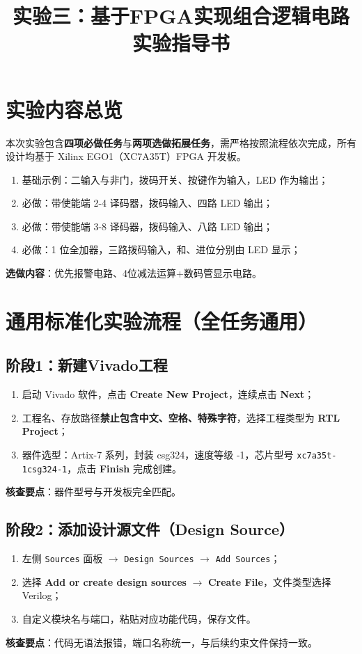 \documentclass[11pt,a4paper]{article}
\begin{document}
\title{实验三：基于FPGA实现组合逻辑电路实验指导书}
\author{}
\date{}
\maketitle

\section{实验内容总览}
本次实验包含\textbf{四项必做任务}与\textbf{两项选做拓展任务}，需严格按照流程依次完成，所有设计均基于 Xilinx EGO1（XC7A35T）FPGA 开发板。
\begin{enumerate}[label=任务\arabic*：]
    \item 基础示例：二输入与非门，拨码开关、按键作为输入，LED 作为输出；
    \item 必做：带使能端 2-4 译码器，拨码输入、四路 LED 输出；
    \item 必做：带使能端 3-8 译码器，拨码输入、八路 LED 输出；
    \item 必做：1 位全加器，三路拨码输入，和、进位分别由 LED 显示；
\end{enumerate}
\noindent \textbf{选做内容}：优先报警电路、4位减法运算+数码管显示电路。

\section{通用标准化实验流程（全任务通用）}
\subsection{阶段1：新建Vivado工程}
\begin{enumerate}
    \item 启动 Vivado 软件，点击 \textbf{Create New Project}，连续点击 \textbf{Next}；
    \item 工程名、存放路径\textbf{禁止包含中文、空格、特殊字符}，选择工程类型为 \textbf{RTL Project}；
    \item 器件选型：Artix-7 系列，封装 csg324，速度等级 -1，芯片型号 \verb|xc7a35t-1csg324-1|，点击 \textbf{Finish} 完成创建。
\end{enumerate}
\textbf{核查要点}：器件型号与开发板完全匹配。

\subsection{阶段2：添加设计源文件（Design Source）}
\begin{enumerate}
    \item 左侧 \texttt{Sources} 面板 $\rightarrow$ \texttt{Design Sources} $\rightarrow$ \texttt{Add Sources}；
    \item 选择 \textbf{Add or create design sources} $\rightarrow$ \textbf{Create File}，文件类型选择 Verilog；
    \item 自定义模块名与端口，粘贴对应功能代码，保存文件。
\end{enumerate}
\textbf{核查要点}：代码无语法报错，端口名称统一，与后续约束文件保持一致。
\end{document}
